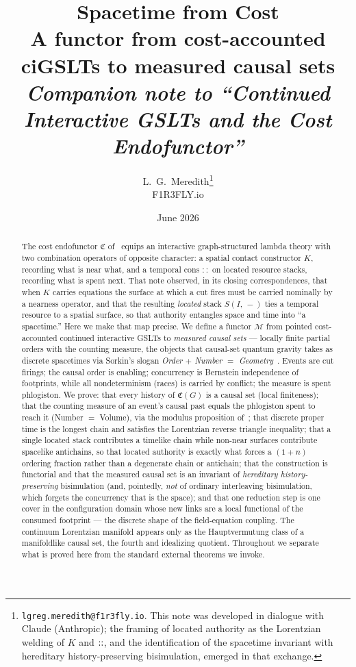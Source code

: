 \documentclass[11pt]{article}
\title{\textbf{Spacetime from Cost}\\[2pt]
\large A functor from cost-accounted ciGSLTs to measured causal sets\\[6pt]
\normalsize\textit{Companion note to ``Continued Interactive GSLTs and the Cost Endofunctor''}}
\author{L.~G.~Meredith\thanks{\texttt{lgreg.meredith@f1r3fly.io}. This
note was developed in dialogue with Claude (Anthropic); the framing of
located authority as the Lorentzian welding of $K$ and $\cons$, and the
identification of the spacetime invariant with hereditary
history-preserving bisimulation, emerged in that exchange.}\\[2pt]
\small F1R3FLY.io}
\date{June 2026}
\theoremstyle{definition}
\theoremstyle{plain}
\newcommand{\Cost}{\mathfrak{C}}
\newcommand{\lstk}[2]{S(#1,\, #2)}     %
\newcommand{\cons}{\mathbin{::}}        %
\newcommand{\Map}{\mathcal{M}}
\theoremstyle{remark}
\begin{document}
\maketitle

\begin{abstract}
The cost endofunctor $\Cost$ of~\cite{CostNote} equips an interactive
graph-structured lambda theory with two combination operators of
opposite character: a spatial contact constructor $K$, recording what is
near what, and a temporal cons $\cons$ on located resource stacks,
recording what is spent next. That note observed, in its closing
correspondences, that when $K$ carries equations the surface at which a
cut fires must be carried nominally by a nearness operator, and that the
resulting \emph{located} stack $\lstk{I}{-}$ ties a temporal resource to
a spatial surface, so that authority entangles space and time into ``a
spacetime.'' Here we make that map precise. We define a functor $\Map$
from pointed cost-accounted continued interactive GSLTs to
\emph{measured causal sets} --- locally finite partial orders with the
counting measure, the objects that causal-set quantum gravity takes as
discrete spacetimes via Sorkin's slogan \emph{Order $+$ Number $=$
Geometry}~\cite{BLMS,SorkinValdivia}. Events are cut firings; the causal
order is enabling; concurrency is Bernstein independence of footprints,
while all nondeterminism (races) is carried by conflict; the measure is
spent phlogiston. We prove: that every history of $\Cost(G)$ is a causal
set (local finiteness); that the counting measure of an event's causal
past equals the phlogiston spent to reach it (Number $=$ Volume), via the
modulus proposition of~\cite{CostNote}; that discrete proper time is the
longest chain and satisfies the Lorentzian reverse triangle inequality;
that a single located stack contributes a timelike chain while non-near
surfaces contribute spacelike antichains, so that located authority is
exactly what forces a $(1{+}n)$ ordering fraction rather than a
degenerate chain or antichain; that the construction is functorial and
that the measured causal set is an invariant of \emph{hereditary
history-preserving} bisimulation (and, pointedly, \emph{not} of ordinary
interleaving bisimulation, which forgets the concurrency that is the
space); and that one reduction step is one cover in the configuration
domain whose new links are a local functional of the consumed footprint
--- the discrete shape of the field-equation coupling. The continuum
Lorentzian manifold appears only as the Hauptvermutung class of a
manifoldlike causal set, the fourth and idealizing quotient. Throughout
we separate what is proved here from the standard external theorems we
invoke.
\end{abstract}
\end{document}
